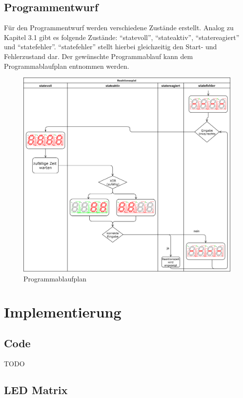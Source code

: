 \documentclass[11pt,ngerman]{report}
\begin{document}
\section{Programmentwurf}

Für den Programmentwurf werden verschiedene Zustände erstellt. Analog zu Kapitel 3.1 gibt es folgende Zustände: “statevoll”, “stateaktiv”, “statereagiert” und “statefehler”. “statefehler” stellt hierbei gleichzeitig den Start- und Fehlerzustand dar. Der gewünschte Programmablauf kann dem Programmablaufplan entnommen werden.

\begin{figure}[h]
	\caption{Programmablaufplan}
	\centering
	\includegraphics[width=\textwidth]{programmablaufdiagramm.png}
\end{figure}


\chapter{Implementierung}

\section{Code}

TODO

\section{LED Matrix}
\end{document}
